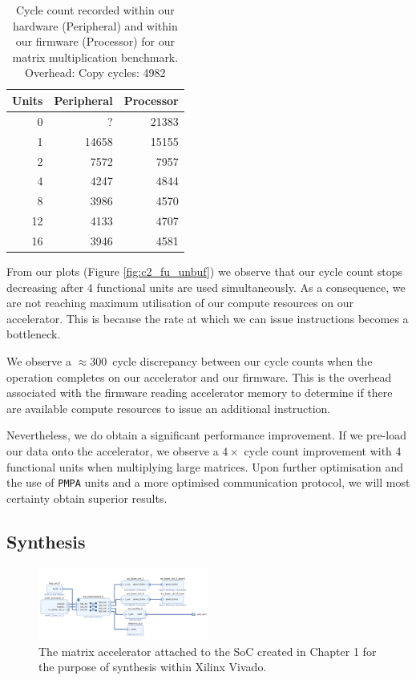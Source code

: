 \documentclass[a4paper,8pt]{report}
\begin{document}
\begin{table}[h]
  \centering
  \begin{tabular}{r|rr}
    \toprule
    Units & Peripheral & Processor \\
    \midrule
    0&?&21383\\
    1&14658&15155\\
    2&7572& 7957\\
    4&4247& 4844\\
    8&3986& 4570\\
    12&4133& 4707\\
    16&3946& 4581\\
    \bottomrule
  \end{tabular}
  \caption{Cycle count recorded within our hardware (Peripheral) and within our
    firmware (Processor) for our matrix multiplication benchmark. Overhead: Copy cycles: 4982}
  \label{table:c2_fu_unbuf}
\end{table}

From our plots (Figure \ref{fig:c2_fu_unbuf}) we observe that our cycle count
stops decreasing after 4 functional units are used simultaneously. As a
consequence, we are not reaching maximum utilisation of our compute resources on
our accelerator. This is because the rate at which we can issue instructions
becomes a bottleneck.

We observe a $\approx 300$~cycle discrepancy between our cycle counts when the
operation completes on our accelerator and our firmware. This is the overhead
associated with the firmware reading accelerator memory to determine if there
are available compute resources to issue an additional instruction.

Nevertheless, we do obtain a significant performance improvement. If we pre-load
our data onto the accelerator, we observe a $4\times$ cycle count improvement
with 4 functional units when multiplying large matrices. Upon further
optimisation and the use of \texttt{PMPA} units and a more optimised
communication protocol, we will most certainty obtain superior results. 

\subsection{Synthesis}
\begin{figure}[h]
  \centering
  \includegraphics[width=0.5\textwidth]{./img/accel_dg.png}
  \caption{The matrix accelerator attached to the SoC created in Chapter 1 for
    the purpose of synthesis within Xilinx Vivado.}
  \label{fig:accel_dg}
\end{figure}
\end{document}
